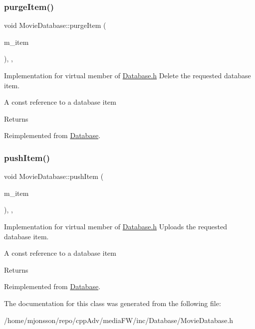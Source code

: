 \subsubsection{\texorpdfstring{purge\+Item()}{purgeItem()}}
{\footnotesize\ttfamily void Movie\+Database\+::purge\+Item (\begin{DoxyParamCaption}\item[{const \hyperlink{classDatabaseItem}{Database\+Item} \&}]{m\+\_\+item }\end{DoxyParamCaption})\hspace{0.3cm}{\ttfamily [inline]}, {\ttfamily [override]}, {\ttfamily [virtual]}}



Implementation for virtual member of \hyperlink{Database_8h_source}{Database.\+h} Delete the requested database item. 

A const reference to a database item

\begin{DoxyReturn}{Returns}

\end{DoxyReturn}


Reimplemented from \hyperlink{classDatabase_a5d232b9f62079682dd7fe7983b252e5e}{Database}.

\mbox{\label{classMovieDatabase_a203b9b5c1b325997ce519859a436b6ce}} 
\subsubsection{\texorpdfstring{push\+Item()}{pushItem()}}
{\footnotesize\ttfamily void Movie\+Database\+::push\+Item (\begin{DoxyParamCaption}\item[{const \hyperlink{classDatabaseItem}{Database\+Item} \&}]{m\+\_\+item }\end{DoxyParamCaption})\hspace{0.3cm}{\ttfamily [inline]}, {\ttfamily [override]}, {\ttfamily [virtual]}}



Implementation for virtual member of \hyperlink{Database_8h_source}{Database.\+h} Uploads the requested database item. 

A const reference to a database item

\begin{DoxyReturn}{Returns}

\end{DoxyReturn}


Reimplemented from \hyperlink{classDatabase_a80fa14ab9f4deadc9a2ab7493f1919a4}{Database}.



The documentation for this class was generated from the following file\+:\begin{DoxyCompactItemize}
\item 
/home/mjonsson/repo/cpp\+Adv/media\+F\+W/inc/\+Database/Movie\+Database.\+h\end{DoxyCompactItemize}
